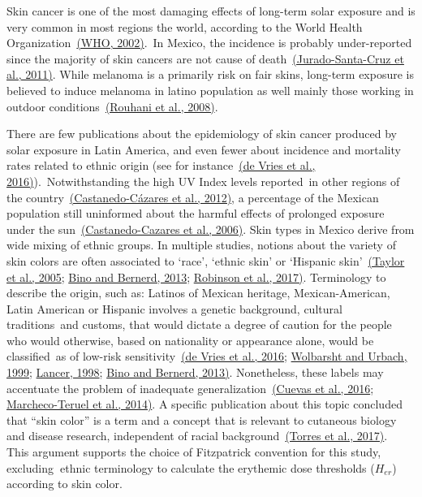 \documentclass[10pt]{article}
\begin{document}
Skin cancer is one of the most damaging effects of long-term solar
exposure and is very common in most regions the world, according to the
World Health Organization~\hyperref[csl:24]{(WHO, 2002)}.~In Mexico, the incidence
is probably under-reported since the majority of skin cancers are not
cause of death~\hyperref[csl:36]{(Jurado-Santa-Cruz et al., 2011)}. While melanoma is a primarily risk on
fair skins, long-term exposure is believed to induce melanoma in latino
population as well mainly those working in outdoor
conditions~\hyperref[csl:37]{(Rouhani et al., 2008)}.

There are few publications about the epidemiology of skin cancer
produced by solar exposure in Latin America, and even fewer about
incidence and mortality rates related to ethnic origin (see for
instance~\hyperref[csl:38]{(de Vries et al., 2016)}).~Notwithstanding the high UV Index levels
reported~in other regions of the country~\hyperref[csl:39]{(Castanedo-Cázares et al., 2012)}, a
percentage of the Mexican population still uninformed about the harmful
effects of prolonged exposure under the sun~\hyperref[csl:40]{(Castanedo-Cazares et al., 2006)}. Skin
types in Mexico derive from wide mixing of ethnic groups. In multiple
studies, notions about the variety of skin colors are often associated
to `race', `ethnic skin' or `Hispanic skin'~\hyperref[csl:41]{(Taylor et al., 2005}; \hyperref[csl:42]{Bino and Bernerd, 2013}; \hyperref[csl:43]{Robinson et al., 2017)}.
Terminology to describe the origin, such as: Latinos of Mexican
heritage, Mexican-American, Latin American or Hispanic involves a
genetic background, cultural traditions~and customs, that would dictate
a degree of caution for the people who would otherwise, based on
nationality or appearance alone, would be classified~as of low-risk
sensitivity~\hyperref[csl:38]{(de Vries et al., 2016}; \hyperref[csl:44]{Wolbarsht and Urbach, 1999}; \hyperref[csl:45]{Lancer, 1998}; \hyperref[csl:42]{Bino and Bernerd, 2013)}. Nonetheless, these labels may accentuate
the problem of inadequate generalization~\hyperref[csl:46]{(Cuevas et al., 2016}; \hyperref[csl:47]{Marcheco-Teruel et al., 2014)}. A specific
publication about this topic concluded that ``skin color'' is a term and
a concept that is relevant to cutaneous biology and disease research,
independent of racial background~\hyperref[csl:48]{(Torres et al., 2017)}.~ This argument
supports the choice of Fitzpatrick convention for this study,
excluding\textbf{~}ethnic terminology to calculate the erythemic dose
thresholds (\(H_{er}\)) according to skin color.~
\end{document}
